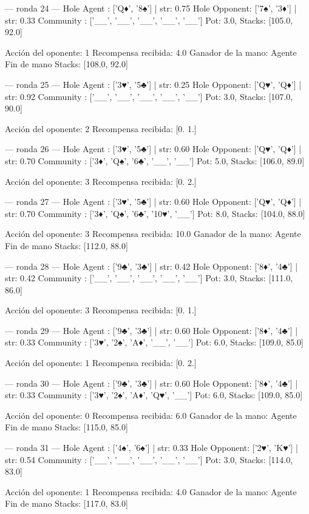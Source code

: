 --- ronda 24 ---
Hole Agent : ['Q♦', '8♠'] | str: 0.75
Hole Opponent: ['7♠', '3♦'] | str: 0.33
Community  : ['__', '__', '__', '__', '__']
Pot: 3.0, Stacks: [105.0, 92.0]

Acción del oponente: 1
Recompensa recibida: 4.0
Ganador de la mano: Agente
Fin de mano Stacks: [108.0, 92.0]


--- ronda 25 ---
Hole Agent : ['3♥', '5♣'] | str: 0.25
Hole Opponent: ['Q♥', 'Q♦'] | str: 0.92
Community  : ['__', '__', '__', '__', '__']
Pot: 3.0, Stacks: [107.0, 90.0]

Acción del oponente: 2
Recompensa recibida: [0. 1.]

--- ronda 26 ---
Hole Agent : ['3♥', '5♣'] | str: 0.60
Hole Opponent: ['Q♥', 'Q♦'] | str: 0.70
Community  : ['3♦', 'Q♠', '6♣', '__', '__']
Pot: 5.0, Stacks: [106.0, 89.0]

Acción del oponente: 3
Recompensa recibida: [0. 2.]

--- ronda 27 ---
Hole Agent : ['3♥', '5♣'] | str: 0.60
Hole Opponent: ['Q♥', 'Q♦'] | str: 0.70
Community  : ['3♦', 'Q♠', '6♣', '10♥', '__']
Pot: 8.0, Stacks: [104.0, 88.0]

Acción del oponente: 3
Recompensa recibida: 10.0
Ganador de la mano: Agente
Fin de mano Stacks: [112.0, 88.0]


--- ronda 28 ---
Hole Agent : ['9♣', '3♣'] | str: 0.42
Hole Opponent: ['8♦', '4♣'] | str: 0.42
Community  : ['__', '__', '__', '__', '__']
Pot: 3.0, Stacks: [111.0, 86.0]

Acción del oponente: 3
Recompensa recibida: [0. 1.]

--- ronda 29 ---
Hole Agent : ['9♣', '3♣'] | str: 0.60
Hole Opponent: ['8♦', '4♣'] | str: 0.33
Community  : ['3♥', '2♠', 'A♦', '__', '__']
Pot: 6.0, Stacks: [109.0, 85.0]

Acción del oponente: 1
Recompensa recibida: [0. 2.]

--- ronda 30 ---
Hole Agent : ['9♣', '3♣'] | str: 0.60
Hole Opponent: ['8♦', '4♣'] | str: 0.33
Community  : ['3♥', '2♠', 'A♦', 'Q♥', '__']
Pot: 6.0, Stacks: [109.0, 85.0]

Acción del oponente: 0
Recompensa recibida: 6.0
Ganador de la mano: Agente
Fin de mano Stacks: [115.0, 85.0]


--- ronda 31 ---
Hole Agent : ['4♠', '6♠'] | str: 0.33
Hole Opponent: ['2♥', 'K♥'] | str: 0.54
Community  : ['__', '__', '__', '__', '__']
Pot: 3.0, Stacks: [114.0, 83.0]

Acción del oponente: 1
Recompensa recibida: 4.0
Ganador de la mano: Agente
Fin de mano Stacks: [117.0, 83.0]


